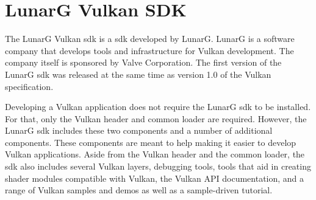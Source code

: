 





  \section{LunarG Vulkan SDK}
  \label{sec:LunarGSDK}
    The LunarG Vulkan \gls{sdk}\cite{lunargvulkansdk} is a \acrlong{sdk} developed by LunarG. LunarG is a software company that develops tools and infrastructure for Vulkan development. The company itself is sponsored by Valve Corporation. The first version of the LunarG \gls{sdk} was released at the same time as version 1.0 of the Vulkan specification.

    Developing a Vulkan application does not require the LunarG \gls{sdk} to be installed. For that, only the Vulkan header and common loader are required. However, the LunarG \gls{sdk} includes these two components and a number of additional components. These components are meant to help making it easier to develop Vulkan applications. Aside from the Vulkan header and the common loader, the \gls{sdk} also includes several Vulkan layers, debugging tools, tools that aid in creating shader modules compatible with Vulkan, the Vulkan API documentation, and a range of Vulkan samples and demos as well as a sample-driven tutorial.



